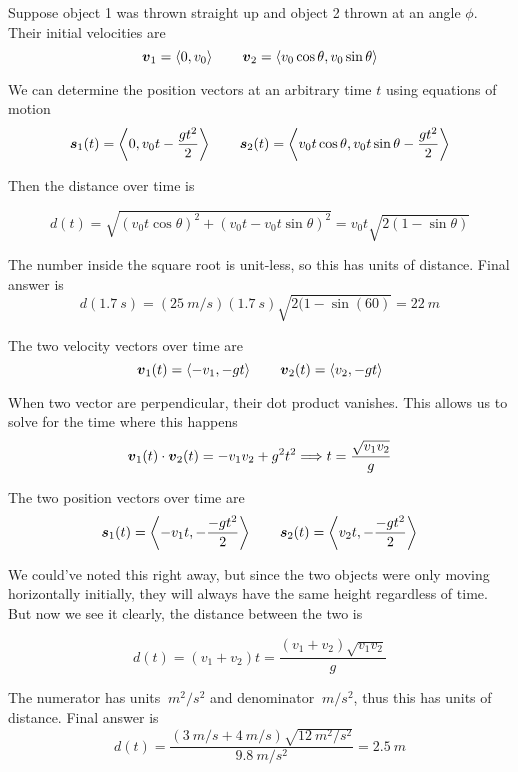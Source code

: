 \begin{exercise}
Suppose object 1 was thrown straight up and object 2 thrown at an angle $\phi$. Their initial velocities are
\[ \vec v_1 = \vbrack{0, v_0} \qquad \vec v_2 = \vbrack{v_0\cos\theta, v_0\sin\theta} \]

We can determine the position vectors at an arbitrary time $t$ using equations of motion
\[ \vec s_1(t) = \vbrack{0, v_0 t - \frac{g t^2}{2}} \qquad \vec s_2(t) = \vbrack{v_0 t \cos\theta, v_0 t \sin\theta - \frac{g t^2}{2}} \]

Then the distance over time is
\begin{answer}
	\[ d(t) = \sqrt{(v_0 t \cos\theta)^2 + (v_0t - v_0 t \sin\theta)^2} = v_0 t \sqrt{2(1 - \sin\theta)} \]
\end{answer}

The number inside the square root is unit-less, so this has units of distance. Final answer is
\[ d(\SI{1.7}{s}) = (\SI{25}{m/s})(\SI{1.7}{s})\sqrt{2(1 - \sin(60)} = \SI{22}{m} \]
\end{exercise}


\begin{exercise}
The two velocity vectors over time are
\[ \vec v_1(t) = \vbrack{-v_1, -gt} \qquad \vec v_2(t) = \vbrack{v_2, -gt} \]

When two vector are perpendicular, their dot product vanishes. This allows us to solve for the time where this happens
\[ \vec v_1(t) \cdot \vec v_2(t) = -v_1v_2 + g^2t^2 \thus t = \frac{\sqrt{v_1v_2}}{g} \]

The two position vectors over time are
\[ \vec s_1(t) = \vbrack{-v_1t, - \frac{-gt^2}{2}} \qquad \vec s_2(t) = \vbrack{v_2 t, -\frac{-gt^2}{2}} \]

\newpage
We could've noted this right away, but since the two objects were only moving horizontally initially, they will always have the same height regardless of time. But now we see it clearly, the distance between the two is
\begin{answer}
	\[ d(t) = (v_1 + v_2)t = \frac{(v_1 + v_2)\sqrt{v_1v_2}}{g} \]
\end{answer}

The numerator has units $\SI{}{m^2/s^2}$ and denominator $\SI{}{m/s^2}$, thus this has units of distance. Final answer is
\[ d(t) = \frac{(\SI{3}{m/s} + \SI{4}{m/s})\sqrt{\SI{12}{m^2/s^2}}}{\SI{9.8}{m/s^2}} = \SI{2.5}{m} \]
\end{exercise}


